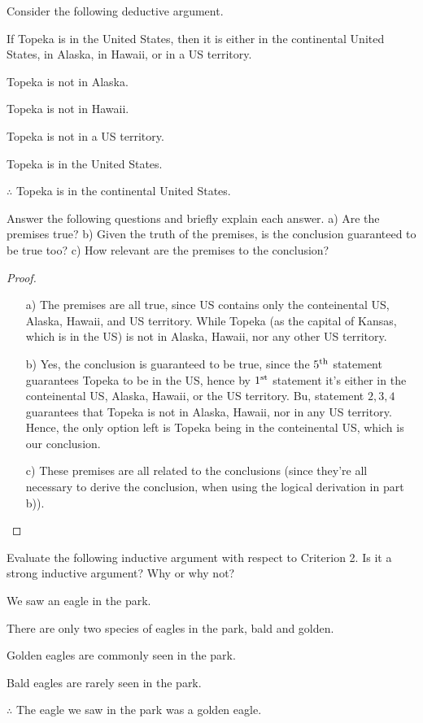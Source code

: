 \documentclass{article}
\begin{document}
\newpage

\begin{ques}\label{q7}
Consider the following deductive argument.

If Topeka is in the United States, then it is either in the continental United
States, in Alaska, in Hawaii, or in a US territory.

Topeka is not in Alaska.

Topeka is not in Hawaii.

Topeka is not in a US territory.

Topeka is in the United States.

$\therefore$ Topeka is in the continental United States.

Answer the following questions and briefly explain each answer. a) Are the
premises true? b) Given the truth of the premises, is the conclusion guaranteed
to be true too? c) How relevant are the premises to the conclusion?
\end{ques}

\begin{proof}

    \hfil

    \begin{itemize}
        \item[a)] The premises are all true, since US contains only the conteinental US, Alaska, Hawaii, and US territory. While Topeka (as the capital of Kansas, which is in the US) is not in Alaska, Hawaii, nor any other US territory.
        \item[b)] Yes, the conclusion is guaranteed to be true, since the $5^\textmd{th}$ statement guarantees Topeka to be in the US, hence by $1^\textmd{st}$ statement it's either in the conteinental US, Alaska, Hawaii, or the US territory. Bu, statement $2,3,4$ guarantees that Topeka is not in Alaska, Hawaii, nor in any US territory. Hence, the only option left is Topeka being in the conteinental US, which is our conclusion.
        \item[c)] These premises are all related to the conclusions (since they're all necessary to derive the conclusion, when using the logical derivation in part b)).
    \end{itemize}
\end{proof}

\hfil

\begin{ques}\label{q8}
Evaluate the following inductive argument with respect to Criterion 2. Is it a strong inductive argument? Why or why not?

We saw an eagle in the park.

There are only two species of eagles in the park, bald and golden.

Golden eagles are commonly seen in the park.

Bald eagles are rarely seen in the park.

$\therefore$ The eagle we saw in the park was a golden eagle.
\end{ques}
\end{document}
